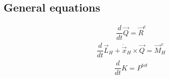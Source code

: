\documentclass[letterpaper,10pt,english]{jupyterBook}
\begin{document}
\subsection{General equations}
\label{\detokenize{ch/dynamics-eom-rigid:general-equations}}
\sphinxAtStartPar
{}
\begin{equation*}
\begin{split}\dfrac{d}{dt} \vec{Q} = \vec{R}^e\end{split}
\end{equation*}
\sphinxAtStartPar
{}
\begin{equation*}
\begin{split}\dfrac{d}{dt} \vec{L}_H + \dot{\vec{x}}_H \times \vec{Q} = \vec{M}_H^e\end{split}
\end{equation*}
\sphinxAtStartPar
{}
\begin{equation*}
\begin{split}\dfrac{d}{dt} K = P^{tot}\end{split}
\end{equation*}
\end{document}
